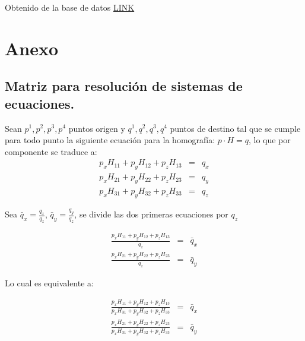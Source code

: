 \documentclass[conference]{IEEEtran}
\begin{document}
\begin{thebibliography}{99}
	  Obtenido de la base de datos \href{www.cvl.isy.liu.se/en/research/datasets/passta/}{LINK}
	 

\end{thebibliography}

\section*{Anexo}
	\subsection{Matriz para resolución de sistemas de ecuaciones.}
		
Sean $p^1, p^2, p^3, p^4$ puntos origen y $q^1, q^2, q^3, q^4$ puntos de destino tal que se cumple para todo punto la siguiente ecuación para la homografía: $p \cdot H = q$, lo que por componente se traduce a: \\
\begin{equation*}
\begin{array}{ccc}
    p_x H_{11} + p_y H_{12} + p_z H_{13} & = & q_x \\
    p_x H_{21} + p_y H_{22} + p_z H_{23} & = & q_y \\
    p_x H_{31} + p_y H_{32} + p_z H_{33} & = & q_z 
\end{array}
\end{equation*}

    Sea $\bar{q}_x = \frac{q_x}{q_z}$, $\bar{q}_y = \frac{q_y}{q_z}$, se divide las dos primeras ecuaciones por $q_z$

\begin{equation*}
    \begin{array}{ccc}
        
    \frac{p_x H_{11} + p_y H_{12} + p_z H_{13}}{q_z} & = & \bar{q}_x \\ 
    
    \frac{p_x H_{21} + p_y H_{22} + p_z H_{23}}{q_z} & = & \bar{q}_y 

    \end{array}    
\end{equation*}    
    
Lo cual es equivalente a:

\begin{equation*}
    \begin{array}{ccc}
    
    \frac{p_x H_{11} + p_y H_{12} + p_z H_{13}}{p_x H_{31} + p_y H_{32} + p_z H_{33}} & = & \bar{q}_x \\
    
    \frac{p_x H_{21} + p_y H_{22} + p_z H_{23}}{p_x H_{31} + p_y H_{32} + p_z H_{33}} & = & \bar{q}_y  \\
    
    \end{array}    
\end{equation*}
\end{document}
